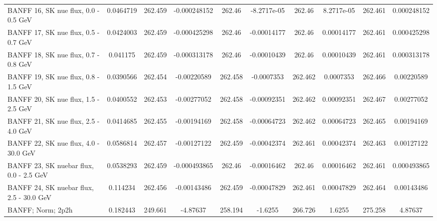 \begin{tabular}{| l | S | S  S | S  S | S  S | S  S | }
                                            BANFF 16, SK nue flux, 0.0 - 0.5 GeV &       0.0464719 &         262.459 &    -0.000248152 &          262.46 &     -8.2717e-05 &          262.46 &      8.2717e-05 &         262.461 &     0.000248152 \\ 
                                            BANFF 17, SK nue flux, 0.5 - 0.7 GeV &       0.0424003 &         262.459 &    -0.000425298 &          262.46 &     -0.00014177 &          262.46 &      0.00014177 &         262.461 &     0.000425298 \\ 
                                            BANFF 18, SK nue flux, 0.7 - 0.8 GeV &        0.041175 &         262.459 &    -0.000313178 &          262.46 &     -0.00010439 &          262.46 &      0.00010439 &         262.461 &     0.000313178 \\ 
                                            BANFF 19, SK nue flux, 0.8 - 1.5 GeV &       0.0390566 &         262.454 &     -0.00220589 &         262.458 &      -0.0007353 &         262.462 &       0.0007353 &         262.466 &      0.00220589 \\ 
                                            BANFF 20, SK nue flux, 1.5 - 2.5 GeV &       0.0400552 &         262.453 &     -0.00277052 &         262.458 &     -0.00092351 &         262.462 &      0.00092351 &         262.467 &      0.00277052 \\ 
                                            BANFF 21, SK nue flux, 2.5 - 4.0 GeV &       0.0414685 &         262.455 &     -0.00194169 &         262.458 &     -0.00064723 &         262.462 &      0.00064723 &         262.465 &      0.00194169 \\ 
                                           BANFF 22, SK nue flux, 4.0 - 30.0 GeV &       0.0586814 &         262.457 &     -0.00127122 &         262.459 &     -0.00042374 &         262.461 &      0.00042374 &         262.463 &      0.00127122 \\ 
                                         BANFF 23, SK nuebar flux, 0.0 - 2.5 GeV &       0.0538293 &         262.459 &    -0.000493865 &          262.46 &     -0.00016462 &          262.46 &      0.00016462 &         262.461 &     0.000493865 \\ 
                                        BANFF 24, SK nuebar flux, 2.5 - 30.0 GeV &        0.114234 &         262.456 &     -0.00143486 &         262.459 &     -0.00047829 &         262.461 &      0.00047829 &         262.464 &      0.00143486 \\ 
                                                               BANFF; Norm; 2p2h &        0.182443 &         249.661 &        -4.87637 &         258.194 &         -1.6255 &         266.726 &          1.6255 &         275.258 &         4.87637 \\ 

\end{tabular}
